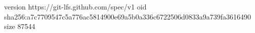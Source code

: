 version https://git-lfs.github.com/spec/v1
oid sha256:a7c7709547c5a776ac5814900e69a5b0a336c6722506d0833a9a739fa3616490
size 87544
